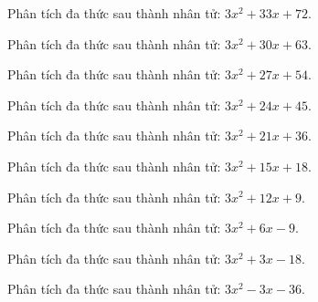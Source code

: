 \begin{bt}
	Phân tích đa thức sau thành nhân tử: $3 x^2 + 33 x + 72$.
\end{bt}
\begin{bt}
	Phân tích đa thức sau thành nhân tử: $3 x^2 + 30 x + 63$.
\end{bt}
\begin{bt}
	Phân tích đa thức sau thành nhân tử: $3 x^2 + 27 x + 54$.
\end{bt}
\begin{bt}
	Phân tích đa thức sau thành nhân tử: $3 x^2 + 24 x + 45$.
\end{bt}
\begin{bt}
	Phân tích đa thức sau thành nhân tử: $3 x^2 + 21 x + 36$.
\end{bt}
\begin{bt}
	Phân tích đa thức sau thành nhân tử: $3 x^2 + 15 x + 18$.
\end{bt}
\begin{bt}
	Phân tích đa thức sau thành nhân tử: $3 x^2 + 12 x + 9$.
\end{bt}
\begin{bt}
	Phân tích đa thức sau thành nhân tử: $3 x^2 + 6 x - 9$.
\end{bt}
\begin{bt}
	Phân tích đa thức sau thành nhân tử: $3 x^2 + 3 x - 18$.
\end{bt}
\begin{bt}
	Phân tích đa thức sau thành nhân tử: $3 x^2 - 3 x - 36$.
\end{bt}

